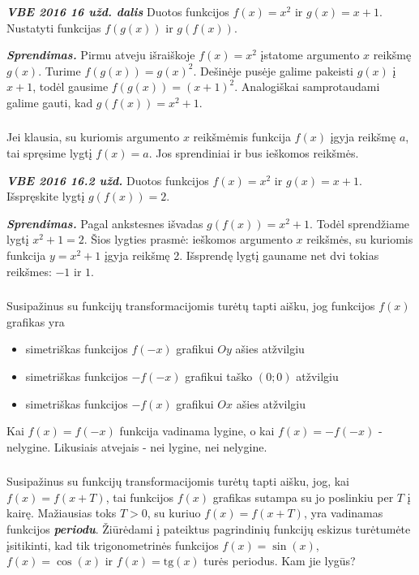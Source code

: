 \documentclass{article}
\begin{document}
\textbf{\textit{VBE 2016 16 užd. dalis}} Duotos funkcijos $f(x)=x^2$ ir $g(x)=x+1$. Nustatyti funkcijas $f(g(x))$ ir $g(f(x))$. 

\textbf{\textit{Sprendimas.}} Pirmu atveju išraiškoje $f(x)=x^2$ įstatome argumento $x$ reikšmę $g(x)$. Turime $f(g(x))=g(x)^2$. Dešinėje pusėje galime pakeisti $g(x)$ į $x+1$, todėl gausime $f(g(x))=(x+1)^2$. Analogiškai samprotaudami galime gauti, kad $g(f(x))=x^2+1$.
\subsubsection*{}
Jei klausia, su kuriomis argumento $x$ reikšmėmis funkcija $f(x)$ įgyja reikšmę $a$, tai spręsime lygtį $f(x)=a$. Jos sprendiniai ir bus ieškomos reikšmės.

\textbf{\textit{VBE 2016 16.2 užd.}} Duotos funkcijos $f(x)=x^2$ ir $g(x)=x+1$. Išspręskite lygtį $g(f(x))=2$. 

\textbf{\textit{Sprendimas.}} Pagal ankstesnes išvadas $g(f(x))=x^2+1$. Todėl sprendžiame lygtį $x^2+1=2$. Šios lygties prasmė: ieškomos argumento $x$ reikšmės, su kuriomis funkcija $y=x^2+1$ įgyja reikšmę 2. Išsprendę lygtį gauname net dvi tokias reikšmes: $-1$ ir $1$.
\subsubsection*{}
Susipažinus su funkcijų transformacijomis turėtų tapti aišku, jog funkcijos $f(x)$ grafikas yra 
\begin{itemize}
\item simetriškas funkcijos $f(-x)$ grafikui $Oy$ ašies atžvilgiu
\item simetriškas funkcijos $-f(-x)$ grafikui taško $(0;0)$ atžvilgiu
\item simetriškas funkcijos $-f(x)$ grafikui $Ox$ ašies atžvilgiu
\end{itemize}
Kai $f(x)=f(-x)$ funkcija vadinama lygine, o kai $f(x)=-f(-x)$ - nelygine. Likusiais atvejais - nei lygine, nei nelygine.
\subsubsection*{}
Susipažinus su funkcijų transformacijomis turėtų tapti aišku, jog, kai $f(x)=f(x+T)$, tai funkcijos $f(x)$ grafikas sutampa su jo poslinkiu per $T$ į kairę. Mažiausias toks $T>0$, su kuriuo $f(x)=f(x+T)$, yra vadinamas funkcijos \textbf{\textit{periodu}}. Žiūrėdami į pateiktus pagrindinių funkcijų eskizus turėtumėte įsitikinti, kad tik trigonometrinės funkcijos $f(x)=\sin (x)$, $f(x)=\cos (x)$ ir $f(x)=\text{tg} (x)$ turės periodus. Kam jie lygūs?
\end{document}
